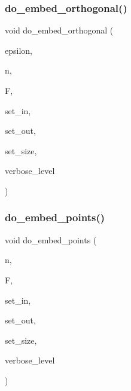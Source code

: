 \subsubsection{\texorpdfstring{do\+\_\+embed\+\_\+orthogonal()}{do\_embed\_orthogonal()}}
{\footnotesize\ttfamily void do\+\_\+embed\+\_\+orthogonal (\begin{DoxyParamCaption}\item[{\mbox{\hyperlink{galois_8h_a09fddde158a3a20bd2dcadb609de11dc}{I\+NT}}}]{epsilon,  }\item[{\mbox{\hyperlink{galois_8h_a09fddde158a3a20bd2dcadb609de11dc}{I\+NT}}}]{n,  }\item[{\mbox{\hyperlink{classfinite__field}{finite\+\_\+field}} $\ast$}]{F,  }\item[{\mbox{\hyperlink{galois_8h_a09fddde158a3a20bd2dcadb609de11dc}{I\+NT}} $\ast$}]{set\+\_\+in,  }\item[{\mbox{\hyperlink{galois_8h_a09fddde158a3a20bd2dcadb609de11dc}{I\+NT}} $\ast$\&}]{set\+\_\+out,  }\item[{\mbox{\hyperlink{galois_8h_a09fddde158a3a20bd2dcadb609de11dc}{I\+NT}}}]{set\+\_\+size,  }\item[{\mbox{\hyperlink{galois_8h_a09fddde158a3a20bd2dcadb609de11dc}{I\+NT}}}]{verbose\+\_\+level }\end{DoxyParamCaption})}

\mbox{\label{geometric__operations_8_c_aa372bf850afb8650574b5b4d1aaecf96}} 
\subsubsection{\texorpdfstring{do\+\_\+embed\+\_\+points()}{do\_embed\_points()}}
{\footnotesize\ttfamily void do\+\_\+embed\+\_\+points (\begin{DoxyParamCaption}\item[{\mbox{\hyperlink{galois_8h_a09fddde158a3a20bd2dcadb609de11dc}{I\+NT}}}]{n,  }\item[{\mbox{\hyperlink{classfinite__field}{finite\+\_\+field}} $\ast$}]{F,  }\item[{\mbox{\hyperlink{galois_8h_a09fddde158a3a20bd2dcadb609de11dc}{I\+NT}} $\ast$}]{set\+\_\+in,  }\item[{\mbox{\hyperlink{galois_8h_a09fddde158a3a20bd2dcadb609de11dc}{I\+NT}} $\ast$\&}]{set\+\_\+out,  }\item[{\mbox{\hyperlink{galois_8h_a09fddde158a3a20bd2dcadb609de11dc}{I\+NT}}}]{set\+\_\+size,  }\item[{\mbox{\hyperlink{galois_8h_a09fddde158a3a20bd2dcadb609de11dc}{I\+NT}}}]{verbose\+\_\+level }\end{DoxyParamCaption})}

